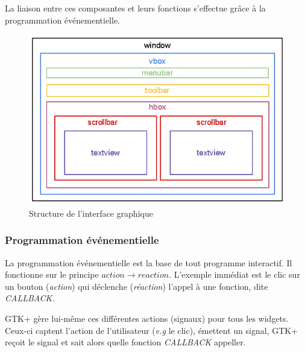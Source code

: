 La liaison entre ces composantes et leurs
fonctions s'effectue grâce à la programmation événementielle. 

\begin{center}
\begin{figure}[hbtp]
  \includegraphics[width=1\textwidth]{images/structure.png}
  \caption{Structure de l'interface graphique}
  \label{structure}
\end{figure}
\end{center}


\subsubsection*{Programmation événementielle}

La programmation événementielle est la base de tout programme
interactif.  Il fonctionne sur le principe $action \rightarrow
reaction$. L'exemple immédiat est le clic sur un bouton
(\textit{action}) qui déclenche (\textit{réaction}) l'appel à une
fonction, dite \textit{CALLBACK}.

GTK+ gère lui-même ces différentes actions (signaux) pour tous les widgets.
Ceux-ci captent l'action de l'utilisateur (\textit{e.g} le clic), émettent 
un signal, GTK+ reçoit le signal et sait alors quelle fonction \textit{CALLBACK} 
appeller.

